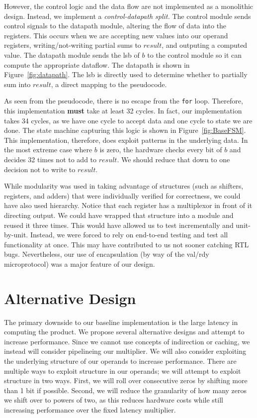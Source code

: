\documentclass[10pt]{article}
\begin{document}
However, the control logic and the data flow are not implemented as a monolithic design.
Instead, we implement a \textit{control-datapath split.}
The control module sends control signals to the datapath module, altering the flow of data into the registers.
This occurs when we are accepting new values into our operand registers,
writing/not-writing partial sums to $result$, and outputing a computed value.
The datapath module sends the lsb of $b$ to the control module so it can compute the appropriate dataflow.
The datapath is shown in Figure~\ref{fig:datapath}.
The lsb is directly used to determine whether to partially sum into $result$, a direct mapping to the pseudocode.

As seen from the pseudocode, there is no escape from the \verb+for+ loop.
Therefore, this implementation \textbf{must} take at least 32 cycles.
In fact, our implementation takes 34 cycles, as we have one cycle to accept data and one cycle to state we are done.
The state machine capturing this logic is shown in Figure~\ref{fig:BaseFSM}. 
This implementation, therefore, does exploit patterns in the underlying data.
In the most extreme case where $b$ is zero, the hardware checks every bit of $b$ and decides 32 times not to add to $result$.
We should reduce that down to one decision not to write to $result$.

While modularity was used in taking advantage of structures (such as shifters, registers, and adders) that were individually verified for correctness, we could have also used hierarchy. Notice that each register has a multiplexor in front of it directing output.
We could have wrapped that structure into a module and reused it three times. 
This would have allowed us to test incrementally and unit-by-unit.
Instead, we were forced to rely on end-to-end testing and test all functionality at once. This may have contributed to us not sooner catching RTL bugs.
Nevertheless, our use of encapsulation (by way of the val/rdy microprotocol) was a major feature of our design.

\section{Alternative Design}

The primary downside to our baseline implementation is the large latency in computing the product.
We propose several alternative designs and attempt to increase performance.
Since we cannot use concepts of indirection or caching, we instead will consider pipelineing our multiplier.
We will also consider exploiting the underlying structure of our operands to increase performance.
There are multiple ways to exploit structure in our operands; we will attempt to exploit structure in two ways.
First, we will roll over consecutive zeros by shifting more than 1 bit if possible.
Second, we will reduce the granularity of how many zeros we shift over to powers of two, as this reduces hardware costs
while still increasing performance over the fixed latency multiplier.
\end{document}
